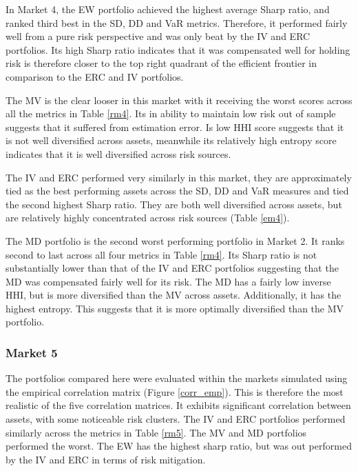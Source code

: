 \documentclass[11pt,preprint, authoryear]{elsarticle}
\numberwithin{equation}{section}
\numberwithin{figure}{section}
\numberwithin{table}{section}
\begin{document}
In Market 4, the EW portfolio achieved the highest average Sharp ratio,
and ranked third best in the SD, DD and VaR metrics. Therefore, it
performed fairly well from a pure risk perspective and was only beat by
the IV and ERC portfolios. Its high Sharp ratio indicates that it was
compensated well for holding risk is therefore closer to the top right
quadrant of the efficient frontier in comparison to the ERC and IV
portfolios.

The MV is the clear looser in this market with it receiving the worst
scores across all the metrics in Table \ref{rm4}. Its in ability to
maintain low risk out of sample suggests that it suffered from
estimation error. Is low HHI score suggests that it is not well
diversified across assets, meanwhile its relatively high entropy score
indicates that it is well diversified across risk sources.

The IV and ERC performed very similarly in this market, they are
approximately tied as the best performing assets across the SD, DD and
VaR measures and tied the second highest Sharp ratio. They are both well
diversified across assets, but are relatively highly concentrated across
risk sources (Table \ref{em4}).

The MD portfolio is the second worst performing portfolio in Market 2.
It ranks second to last across all four metrics in Table \ref{rm4}. Its
Sharp ratio is not substantially lower than that of the IV and ERC
portfolios suggesting that the MD was compensated fairly well for its
risk. The MD has a fairly low inverse HHI, but is more diversified than
the MV across assets. Additionally, it has the highest entropy. This
suggests that it is more optimally diversified than the MV portfolio.

\hypertarget{market-5}{%
\subsubsection{Market 5}\label{market-5}}

The portfolios compared here were evaluated within the markets simulated
using the empirical correlation matrix (Figure \ref{corr_emp}). This is
therefore the most realistic of the five correlation matrices. It
exhibits significant correlation between assets, with some noticeable
risk clusters. The IV and ERC portfolios performed similarly across the
metrics in Table \ref{rm5}. The MV and MD portfolios performed the
worst. The EW has the highest sharp ratio, but was out performed by the
IV and ERC in terms of risk mitigation.
\end{document}
